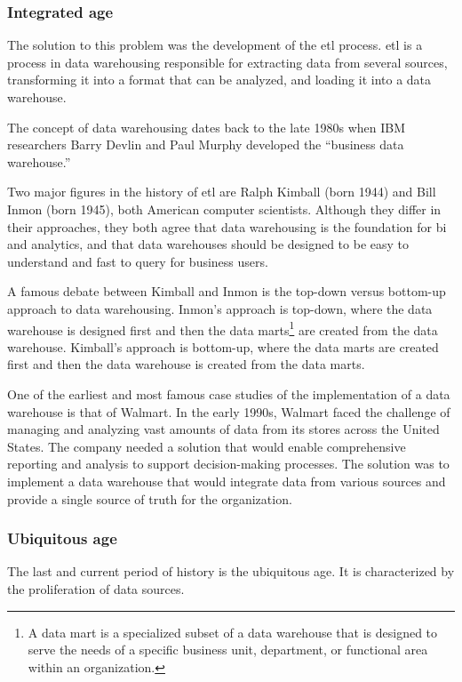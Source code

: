 \subsubsection{Integrated age}

The solution to this problem was the development of the \gls{etl}
process.  \gls{etl} is a process in data warehousing responsible for extracting data from
several sources, transforming it into a format that can be analyzed, and loading it into a
data warehouse.

The concept of data warehousing dates back to the late 1980s when IBM researchers Barry
Devlin and Paul Murphy developed the ``business data warehouse.''

Two major figures in the history of \gls{etl} are Ralph Kimball (born 1944) and Bill Inmon (born
1945), both American computer scientists.  Although they
differ in their approaches, they both agree that data warehousing is the foundation for
\gls{bi} and analytics, and that data warehouses should be designed to
be easy to understand and fast to query for business users.

A famous debate between Kimball and Inmon is the top-down versus bottom-up approach to
data warehousing.  Inmon's approach is top-down, where the data warehouse is designed
first and then the data marts\footnote{A data mart is a specialized subset of a data
warehouse that is designed to serve the needs of a specific business unit, department, or
functional area within an organization.} are created from the data warehouse.  Kimball's
approach is bottom-up, where the data marts are created first and then the data warehouse
is created from the data marts.

One of the earliest and most famous case studies of the implementation of a data warehouse
is that of Walmart. In the early 1990s, Walmart faced the challenge of managing and
analyzing vast amounts of data from its stores across the United States. The company
needed a solution that would enable comprehensive reporting and analysis to support
decision-making processes.  The solution was to implement a data warehouse that would
integrate data from various sources and provide a single source of truth for the
organization.

\subsubsection{Ubiquitous age}

The last and current period of history is the ubiquitous age.  It is characterized by the
proliferation of data sources.

